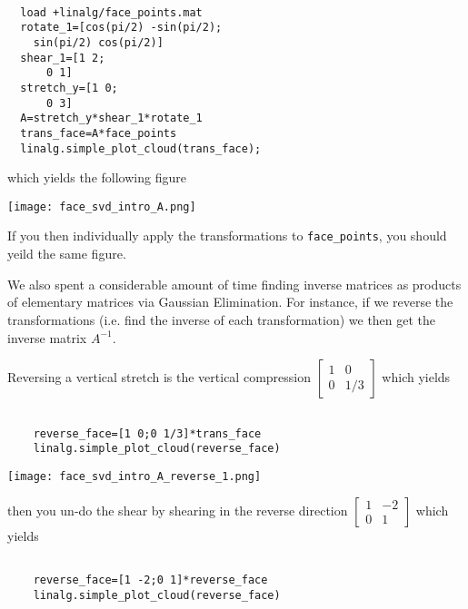 \documentclass{ximera}
\begin{document}
\begin{verbatim}

  load +linalg/face_points.mat
  rotate_1=[cos(pi/2) -sin(pi/2);
    sin(pi/2) cos(pi/2)]
  shear_1=[1 2;
      0 1]
  stretch_y=[1 0;
      0 3]
  A=stretch_y*shear_1*rotate_1
  trans_face=A*face_points
  linalg.simple_plot_cloud(trans_face);

\end{verbatim}

which yields the following figure 

\begin{center}
  \texttt{[image: face\_svd\_intro\_A.png]}
\end{center}

If you then individually apply the transformations to \texttt{face\_points}, you should yeild the same figure. 

We also spent a considerable amount of time finding inverse matrices as products of elementary matrices via Gaussian Elimination. For instance, if we reverse the transformations (i.e. find the inverse of each transformation) we then get the inverse matrix $A^{-1}$.

Reversing a vertical stretch is the vertical compression $\begin{bmatrix}1 &0\\
  0 &1/3\end{bmatrix}$ which yields

  \begin{verbatim}

    reverse_face=[1 0;0 1/3]*trans_face
    linalg.simple_plot_cloud(reverse_face)

  \end{verbatim}

\begin{center}
  \texttt{[image: face\_svd\_intro\_A\_reverse\_1.png]}
\end{center}

then you un-do the shear by shearing in the reverse direction $\begin{bmatrix}1 &-2\\
  0 &1\end{bmatrix}$ which yields 

  \begin{verbatim}

    reverse_face=[1 -2;0 1]*reverse_face
    linalg.simple_plot_cloud(reverse_face)

  \end{verbatim}
\end{document}
